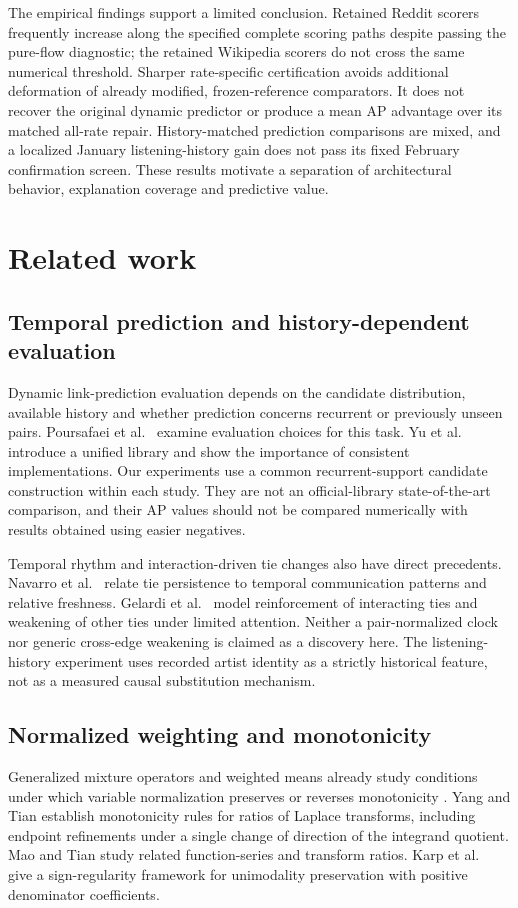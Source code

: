 The empirical findings support a limited conclusion. Retained Reddit scorers frequently increase along the specified complete scoring paths despite passing the pure-flow diagnostic; the retained Wikipedia scorers do not cross the same numerical threshold. Sharper rate-specific certification avoids additional deformation of already modified, frozen-reference comparators. It does not recover the original dynamic predictor or produce a mean AP advantage over its matched all-rate repair. History-matched prediction comparisons are mixed, and a localized January listening-history gain does not pass its fixed February confirmation screen. These results motivate a separation of architectural behavior, explanation coverage and predictive value.

\section{Related work}\label{sec:related}
\subsection{Temporal prediction and history-dependent evaluation}
Dynamic link-prediction evaluation depends on the candidate distribution, available history and whether prediction concerns recurrent or previously unseen pairs. Poursafaei et al.\ \cite{evaluation} examine evaluation choices for this task. Yu et al.\ \cite{dyglib} introduce a unified library and show the importance of consistent implementations. Our experiments use a common recurrent-support candidate construction within each study. They are not an official-library state-of-the-art comparison, and their AP values should not be compared numerically with results obtained using easier negatives.

Temporal rhythm and interaction-driven tie changes also have direct precedents. Navarro et al.\ \cite{cadence} relate tie persistence to temporal communication patterns and relative freshness. Gelardi et al.\ \cite{competition} model reinforcement of interacting ties and weakening of other ties under limited attention. Neither a pair-normalized clock nor generic cross-edge weakening is claimed as a discovery here. The listening-history experiment uses recorded artist identity as a strictly historical feature, not as a measured causal substitution mechanism.

\subsection{Normalized weighting and monotonicity}
Generalized mixture operators and weighted means already study conditions under which variable normalization preserves or reverses monotonicity \cite{mixture,weighted}. Yang and Tian \cite{ratio} establish monotonicity rules for ratios of Laplace transforms, including endpoint refinements under a single change of direction of the integrand quotient. Mao and Tian \cite{series} study related function-series and transform ratios. Karp et al.\ \cite{karp} give a sign-regularity framework for unimodality preservation with positive denominator coefficients.

